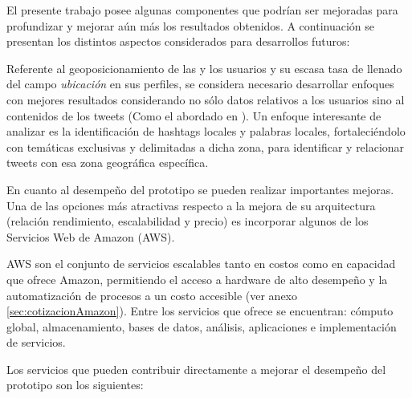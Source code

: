 El presente trabajo posee algunas componentes que podrían ser mejoradas para profundizar y mejorar aún más los resultados obtenidos. A continuación se presentan los distintos aspectos considerados para desarrollos futuros:

Referente al geoposicionamiento de las y los usuarios y su escasa tasa de llenado del campo \emph{ubicación} en sus perfiles, se considera necesario desarrollar enfoques con mejores resultados considerando no sólo datos relativos a los usuarios sino al contenidos de los tweets (Como el abordado en \cite{Cheng:2010:YYT:1871437.1871535} \cite{doi:10.1080/00330124.2014.907699} \cite{Dredze_carmen:a} \cite{GraellsGarridoP13}). Un enfoque interesante de analizar es la identificación de hashtags locales y palabras locales, fortaleciéndolo con temáticas exclusivas y delimitadas a dicha zona, para identificar y relacionar tweets con esa zona geográfica específica.

	En cuanto al desempeño del prototipo se pueden realizar importantes mejoras. Una de las opciones más atractivas respecto a la mejora de su arquitectura (relación rendimiento, escalabilidad y precio) es incorporar algunos de los Servicios Web de Amazon (AWS). 
	
	AWS son el conjunto de servicios escalables tanto en costos como en capacidad que ofrece Amazon, permitiendo el acceso a hardware de alto desempeño y la automatización de procesos a un costo accesible (ver anexo \ref{sec:cotizacionAmazon}). Entre los servicios que  ofrece se encuentran: cómputo global, almacenamiento, bases de datos, análisis, aplicaciones e implementación de servicios.
	
	Los servicios que pueden contribuir directamente a mejorar el desempeño del prototipo son los siguientes:
	
